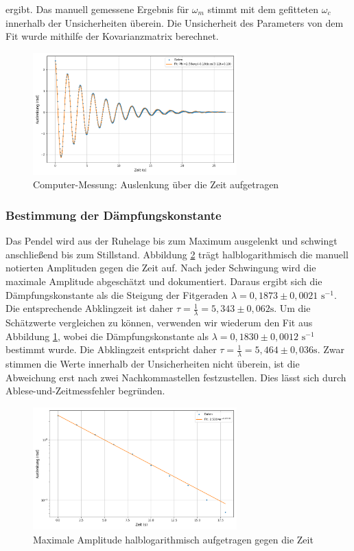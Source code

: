 \documentclass{article}
\begin{document}
ergibt. Das manuell gemessene Ergebnis für $\omega_m$ stimmt mit dem gefitteten $\omega_c$ innerhalb der Unsicherheiten überein. Die Unsicherheit des Parameters von dem Fit wurde mithilfe der Kovarianzmatrix berechnet.

\begin{figure}[H]
    \centering
    \includegraphics[width=0.7\textwidth]{Figure_11.png}
    \caption{Computer-Messung: Auslenkung über die Zeit aufgetragen}
    \label{fig:voltage_time}
\end{figure}

\subsubsection{Bestimmung der Dämpfungskonstante}
Das Pendel wird aus der Ruhelage bis zum Maximum ausgelenkt und schwingt anschließend bis zum Stillstand. Abbildung \ref{fig:max_amplitude} trägt halblogarithmisch die manuell notierten Amplituden gegen die Zeit auf.  Nach jeder Schwingung wird die maximale Amplitude abgeschätzt und dokumentiert. Daraus ergibt sich die Dämpfungskonstante als die Steigung der Fitgeraden $\lambda = 0,1873 \pm 0,0021$ $\text{s}^{-1}$. Die entsprechende Abklingzeit ist daher $\tau = \frac{1}{\lambda} = 5,343\pm0,062 \si{\second}$. Um die Schätzwerte vergleichen zu können, verwenden wir wiederum den Fit aus Abbildung \ref{fig:voltage_time}, wobei die Dämpfungskonstante als $\lambda = 0,1830 \pm 0,0012$ $\text{s}^{-1}$ bestimmt wurde. Die Abklingzeit entspricht daher $\tau = \frac{1}{\lambda} = 5,464\pm0,036 \si{\second}$. Zwar stimmen die Werte innerhalb der Unsicherheiten nicht überein, ist die Abweichung erst nach zwei Nachkommastellen festzustellen. Dies lässt sich durch Ablese-und-Zeitmessfehler begründen.


\begin{figure}[H]
    \centering
    \includegraphics[width=0.7\textwidth]{Figure_12.png}
    \caption{Maximale Amplitude halblogarithmisch aufgetragen gegen die Zeit}
    \label{fig:max_amplitude}
\end{figure}
\end{document}
